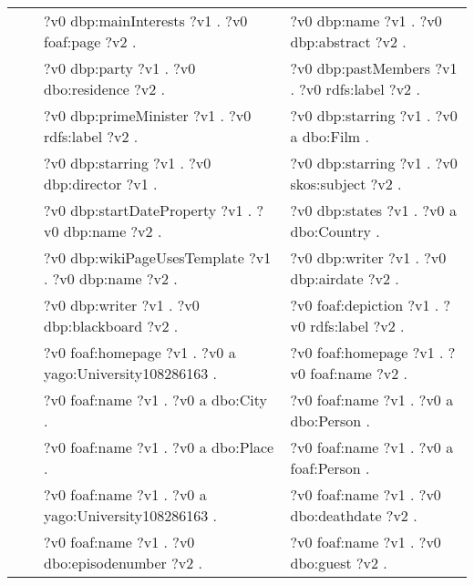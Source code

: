 \begin{table}
{\begin{tabular}{!{\color{white}\vrule}l!{\color{white}\vrule}c@{\hs}!{\color{white}\vrule}p{11.5cm}!{\color{white}\vrule}p{11.5cm}!{\color{white}\vrule}}
			 &  \phantom{a} &     ?v0 dbp:mainInterests ?v1 .  ?v0 foaf:page ?v2 . &  ?v0 dbp:name ?v1 .  ?v0 dbp:abstract ?v2 . \\
			 &  \phantom{a} &     ?v0 dbp:party ?v1 .  ?v0 dbo:residence ?v2 . &  ?v0 dbp:pastMembers ?v1 .  ?v0 rdfs:label ?v2 . \\
			 &  \phantom{a} &     ?v0 dbp:primeMinister ?v1 .  ?v0 rdfs:label ?v2 . &  ?v0 dbp:starring ?v1 .  ?v0 a dbo:Film . \\
			 &  \phantom{a} &     ?v0 dbp:starring ?v1 .  ?v0 dbp:director ?v1 . &  ?v0 dbp:starring ?v1 .  ?v0 skos:subject ?v2 . \\
			 &  \phantom{a} &     ?v0 dbp:startDateProperty ?v1 .  ?v0 dbp:name ?v2 . &  ?v0 dbp:states ?v1 .  ?v0 a dbo:Country . \\
			 &  \phantom{a} &     ?v0 dbp:wikiPageUsesTemplate ?v1 .  ?v0 dbp:name ?v2 . &  ?v0 dbp:writer ?v1 .  ?v0 dbp:airdate ?v2 . \\
			 &  \phantom{a} &     ?v0 dbp:writer ?v1 .  ?v0 dbp:blackboard ?v2 . &  ?v0 foaf:depiction ?v1 .  ?v0 rdfs:label ?v2 . \\
			 &  \phantom{a} &     ?v0 foaf:homepage ?v1 .  ?v0 a yago:University108286163 . &  ?v0 foaf:homepage ?v1 .  ?v0 foaf:name ?v2 . \\
			 &  \phantom{a} &     ?v0 foaf:name ?v1 .  ?v0 a dbo:City . &  ?v0 foaf:name ?v1 .  ?v0 a dbo:Person . \\
			 &  \phantom{a} &     ?v0 foaf:name ?v1 .  ?v0 a dbo:Place . &  ?v0 foaf:name ?v1 .  ?v0 a foaf:Person . \\
			 &  \phantom{a} &     ?v0 foaf:name ?v1 .  ?v0 a yago:University108286163 . &  ?v0 foaf:name ?v1 .  ?v0 dbo:deathdate ?v2 . \\
			 &  \phantom{a} &     ?v0 foaf:name ?v1 .  ?v0 dbo:episodenumber ?v2 . &  ?v0 foaf:name ?v1 .  ?v0 dbo:guest ?v2 . \\

\end{tabular}}
\end{table}
